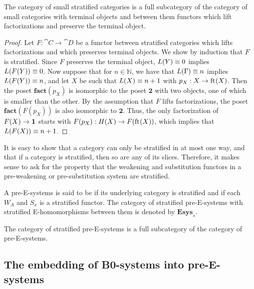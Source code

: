 \begin{lem}
The category of small stratified categories is a full subcategory of the category
of small categories with terminal objects and between them functors which lift 
factorizations and preserve the terminal object.
\end{lem}

\begin{proof}
Let $F:\cat{C}\to\cat{D}$ be a functor between stratified categories which lifts
factorizations and 
which preserves terminal objects. We show by induction that $F$ is stratified.
Since $F$ preserves the terminal object, $L(Y)\equiv 0$ implies $L(F(Y))\equiv 0$.
Now suppose that for $n\in\mathbb{N}$, we have that $L(\Gamma)\equiv n$ implies
$L(F(Y))\equiv n$, and let $X$ be such that $L(X)\equiv n+1$ with
$p_X:X\to\mathrm{ft}_{}(X)$. Then the poset $\mathbf{fact}(p_X)$ is isomorphic to the
poset $\mathbf{2}$ with two objects, one of which is smaller than the other. By the
assumption that $F$ lifts factorizations, the poset $\mathbf{fact}(F(p_X))$
is also isomorphic to $\mathbf{2}$. Thus, the only factorization
of $F(X)\to\mathbf{1}$ starts with $F(p_X):H(X)\to F(\mathrm{ft}_{}(X))$, which implies that
$L(F(X))\equiv n+1$. 
\end{proof}

\begin{rmk}
It is easy to show that a category can only be stratified in at most one way,
and that if a category is stratified, then so are any of its slices. Therefore,
it makes sense to ask for the property that the weakening and substitution
functors in a pre-weakening or pre-substitution system are stratified.
\end{rmk}

\begin{defn}
A pre-E-systems is said to be  if its underlying category is
stratified and if each $W_A$ and $S_x$ is a stratified functor. The category of
stratified pre-E-systems with stratified E-homomorphisms between them is denoted by
$\mathbf{Esys}_s$.
\end{defn}

\begin{cor}\label{lem:strat_full}
The category of stratified pre-E-systems is a full subcategory of the category of
pre-E-systems.
\end{cor}

\subsection{The embedding of B0-systems into pre-E-systems}

